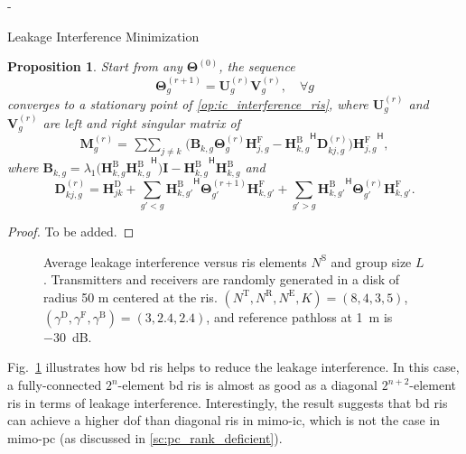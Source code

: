 \documentclass[journal]{IEEEtran}
\newtheorem{proposition}{Proposition}
\begin{document}
\begin{section}{-}
\begin{subsection}{Leakage Interference Minimization}
		\begin{proposition}
			Start from any $\mathbf{\Theta}^{(0)}$, the sequence
			\begin{equation}
				\mathbf{\Theta}_g^{(r+1)} = \mathbf{U}_g^{(r)} \mathbf{V}_g^{(r)}, \quad \forall g
			\end{equation}
			converges to a stationary point of \eqref{op:ic_interference_ris}, where $\mathbf{U}_g^{(r)}$ and $\mathbf{V}_g^{(r)}$ are left and right singular matrix of
			\begin{equation}
				\mathbf{M}_g^{(r)} = \mathop{\sum\sum}_{j \neq k} \bigl(\mathbf{B}_{k,g} \mathbf{\Theta}_g^{(r)} \mathbf{H}_{j,g}^\mathrm{F} - {\mathbf{H}_{k,g}^\mathrm{B}}^\mathsf{H} \mathbf{D}_{kj,g}^{(r)}\bigr) {\mathbf{H}_{j,g}^\mathrm{F}}^\mathsf{H},
			\end{equation}
			where $\mathbf{B}_{k,g} = \lambda_1\bigl(\mathbf{H}_{k,g}^\mathrm{B} {\mathbf{H}_{k,g}^\mathrm{B}}^\mathsf{H}\bigr) \mathbf{I} - {\mathbf{H}_{k,g}^\mathrm{B}}^\mathsf{H} \mathbf{H}_{k,g}^\mathrm{B}$ and
			\begin{equation}
				\mathbf{D}_{kj,g}^{(r)} = \mathbf{H}_{jk}^\mathrm{D} + \sum_{g'<g} {\mathbf{H}_{k,g'}^\mathrm{B}}^\mathsf{H} \mathbf{\Theta}_{g'}^{(r+1)} \mathbf{H}_{k,g'}^\mathrm{F} + \sum_{g'>g} {\mathbf{H}_{k,g'}^\mathrm{B}}^\mathsf{H} \mathbf{\Theta}_{g'}^{(r)} \mathbf{H}_{k,g'}^\mathrm{F}.
			\end{equation}
		\end{proposition}
		\begin{proof}
			To be added.
		\end{proof}

		\begin{figure}[!t]
			\centering
			\resizebox{0.65\columnwidth}{!}{
				
			}
			\caption{Average leakage interference versus \gls{ris} elements $N^\mathrm{S}$ and group size $L$. Transmitters and receivers are randomly generated in a disk of radius 50 m centered at the \gls{ris}. $(N^\mathrm{T}, N^\mathrm{R}, N^\mathrm{E}, K) = (8, 4, 3, 5)$, $(\gamma^\mathrm{D}, \gamma^\mathrm{F}, \gamma^\mathrm{B}) = (3, 2.4, 2.4)$, and reference pathloss at \qty{1}{\meter} is \qty{-30}{\dB}.}
			\label{sm:ic_interference_sx}
		\end{figure}
		Fig.~\ref{sm:ic_interference_sx} illustrates how \gls{bd} \gls{ris} helps to reduce the leakage interference.
		In this case, a fully-connected $2^n$-element \gls{bd} \gls{ris} is almost as good as a diagonal $2^{n+2}$-element \gls{ris} in terms of leakage interference.
		Interestingly, the result suggests that \gls{bd} \gls{ris} can achieve a higher \gls{dof} than diagonal \gls{ris} in \gls{mimo}-\gls{ic}, which is not the case in \gls{mimo}-\gls{pc} (as discussed in \ref{sc:pc_rank_deficient}).
	\end{subsection}


\end{section}
\end{document}
